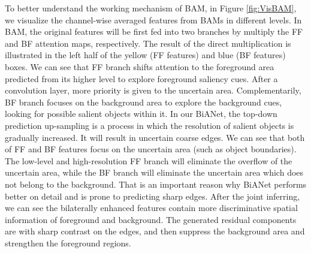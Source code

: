 \documentclass[journal]{IEEEtran}
\newcommand{\figref}[1]{Figure \ref{#1}}
\begin{document}
To better understand the working mechanism of BAM, in \figref{fig:VisBAM}, we visualize the channel-wise averaged features from BAMs in different levels.
In BAM, the original features will be first fed into two branches by multiply the FF and BF attention maps, respectively.
The result of the direct multiplication is illustrated in the left half of the yellow (FF features) and blue (BF features) boxes.
We can see that FF branch shifts attention to the foreground area predicted from its higher level to explore foreground saliency cues.
After a convolution layer, more priority is given to the uncertain area.
Complementarily, BF branch focuses on the background area to explore the background cues, looking for possible salient objects within it.
In our BiANet,
the top-down prediction up-sampling is a process in which the resolution of salient objects is gradually increased. 
It will result in uncertain coarse edges.
We can see that both of FF and BF features focus on the uncertain area (such as object boundaries).
The low-level and high-resolution FF branch will eliminate the overflow of the uncertain area, 
while the BF branch will eliminate the uncertain area which does not belong to the background.
That is an important reason why BiANet performs better on detail
and is prone to predicting sharp edges.
After the joint inferring, we can see the bilaterally enhanced features contain more discriminative spatial information of foreground and background.
The generated residual components are with sharp contrast on the edges,
and then suppress the background area and strengthen the foreground regions.
\end{document}

